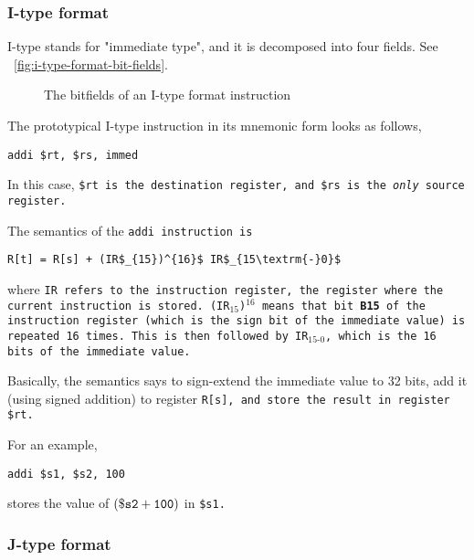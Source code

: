 \subsubsection{I-type format}

I-type stands for "immediate type", and it is decomposed into four
fields. See ~\autoref{fig:i-type-format-bit-fields}.

\begin{figure}[H]
  \makebox[\textwidth][c]{
  }
  \caption{The bitfields of an I-type format instruction}
  \label{fig:i-type-format-bit-fields}
\end{figure}

The prototypical I-type instruction in its mnemonic form looks as follows,

\begin{lstlisting}[style=mips_lst]
addi $rt, $rs, immed
\end{lstlisting}

In this case, \tt{\$rt} is the destination register, and
\tt{\$rs} is the \emph{only} source register.

The semantics of the \tt{addi} instruction is

\begin{lstlisting}[style=semantics_lst]
R[t] = R[s] + (IR$_{15})^{16}$ IR$_{15\textrm{-}0}$
\end{lstlisting}

where \tt{IR} refers to the instruction register, the register
where the current instruction is stored. \tt{(IR$_{15}$)$^{16}$}
means that bit \textbf{B15} of the instruction register (which is the
sign bit of the immediate value) is repeated 16 times. This is then
followed by \tt{IR$_{15\textrm{-}0}$}, which is the 16 bits of
the immediate value.

Basically, the semantics says to sign-extend the immediate value to 32
bits, add it (using signed addition) to register \tt{R[s]}, and store
the result in register \tt{\$rt}.

For an example,

\begin{lstlisting}[style=mips_lst]
addi $s1, $s2, 100
\end{lstlisting}

stores the value of $(\tt{\$s2} + 100)$ in \tt{\$s1}.

\subsubsection{J-type format}

